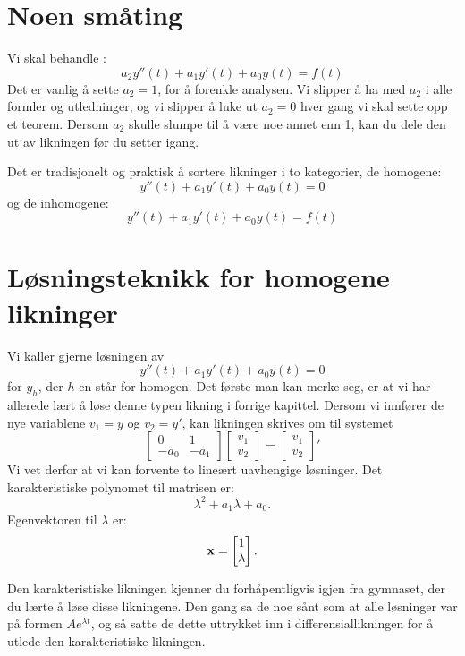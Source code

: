 \section*{Noen småting}
Vi skal behandle :
\[
a_2y''(t)+a_1y'(t)+a_0y(t)=f(t)
\]
Det er vanlig å sette $a_2=1$, for å forenkle analysen. 
Vi slipper å ha med $a_2$ i alle formler og utledninger, og vi slipper å luke ut $a_2=0$ hver gang vi skal sette opp et teorem. 
Dersom $a_2$ skulle slumpe til å være noe annet enn 1, kan du dele den ut av likningen før du setter igang.

Det er tradisjonelt og praktisk å sortere likninger i to kategorier, de homogene:
\[
y''(t)+a_1y'(t)+a_0y(t)=0
\]
og de inhomogene:
\[
y''(t)+a_1y'(t)+a_0y(t)=f(t)
\]




\section*{Løsningsteknikk for homogene likninger}

Vi kaller gjerne løsningen av 
\[
y''(t)+a_1y'(t)+a_0y(t)=0
\]
for $y_h$, der $h$-en står for homogen.
Det første man kan merke seg, er at vi har allerede lært å løse denne typen likning i forrige kapittel. 
Dersom vi innfører de nye variablene $v_1=y$ og $v_2=y'$, kan likningen skrives om til systemet
\[
\begin{bmatrix}
0 & 1 \\ -a_0 & -a_1
\end{bmatrix}
\begin{bmatrix}
v_1 \\ v_2
\end{bmatrix}
=
\begin{bmatrix}
v_1 \\ v_2
\end{bmatrix}'
\]
Vi vet derfor at vi kan forvente to lineært uavhengige løsninger. Det karakteristiske polynomet til matrisen er:
\[
\lambda^2+a_1\lambda + a_0.
\]
Egenvektoren til $\lambda$ er:
\[
\mathbf{x}=
\begin{bmatrix}
1 \\ \lambda
\end{bmatrix}.
\]

Den karakteristiske likningen kjenner du forhåpentligvis igjen fra gymnaset, der du lærte å løse disse likningene. 
Den gang sa de noe sånt som at alle løsninger var på formen $Ae^{\lambda t}$, og
så satte de dette uttrykket inn i differensiallikningen for å utlede den karakteristiske likningen. 

